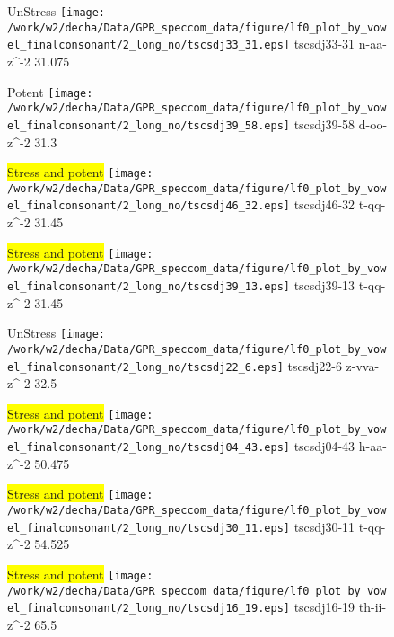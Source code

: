 \documentclass{article}
\begin{document}
\begin{figure}[t]
\begin{minipage}[b]{.24\textwidth}
UnStress
\centering
\texttt{[image: /work/w2/decha/Data/GPR\_speccom\_data/figure/lf0\_plot\_by\_vowel\_finalconsonant/2\_long\_no/tscsdj33\_31.eps]}
tscsdj33-31 n-aa-z\textasciicircum-2 31.075
\end{minipage}
\begin{minipage}[b]{.24\textwidth}
\colorbox{Apricot}{Potent}
\centering
\texttt{[image: /work/w2/decha/Data/GPR\_speccom\_data/figure/lf0\_plot\_by\_vowel\_finalconsonant/2\_long\_no/tscsdj39\_58.eps]}
tscsdj39-58 d-oo-z\textasciicircum-2 31.3
\end{minipage}
\begin{minipage}[b]{.24\textwidth}
\colorbox{yellow}{Stress and potent}
\centering
\texttt{[image: /work/w2/decha/Data/GPR\_speccom\_data/figure/lf0\_plot\_by\_vowel\_finalconsonant/2\_long\_no/tscsdj46\_32.eps]}
tscsdj46-32 t-qq-z\textasciicircum-2 31.45
\end{minipage}
\begin{minipage}[b]{.24\textwidth}
\colorbox{yellow}{Stress and potent}
\centering
\texttt{[image: /work/w2/decha/Data/GPR\_speccom\_data/figure/lf0\_plot\_by\_vowel\_finalconsonant/2\_long\_no/tscsdj39\_13.eps]}
tscsdj39-13 t-qq-z\textasciicircum-2 31.45
\end{minipage}
\end{figure}
\clearpage
\begin{figure}[t]
\begin{minipage}[b]{.24\textwidth}
UnStress
\centering
\texttt{[image: /work/w2/decha/Data/GPR\_speccom\_data/figure/lf0\_plot\_by\_vowel\_finalconsonant/2\_long\_no/tscsdj22\_6.eps]}
tscsdj22-6 z-vva-z\textasciicircum-2 32.5
\end{minipage}
\begin{minipage}[b]{.24\textwidth}
\colorbox{yellow}{Stress and potent}
\centering
\texttt{[image: /work/w2/decha/Data/GPR\_speccom\_data/figure/lf0\_plot\_by\_vowel\_finalconsonant/2\_long\_no/tscsdj04\_43.eps]}
tscsdj04-43 h-aa-z\textasciicircum-2 50.475
\end{minipage}
\begin{minipage}[b]{.24\textwidth}
\colorbox{yellow}{Stress and potent}
\centering
\texttt{[image: /work/w2/decha/Data/GPR\_speccom\_data/figure/lf0\_plot\_by\_vowel\_finalconsonant/2\_long\_no/tscsdj30\_11.eps]}
tscsdj30-11 t-qq-z\textasciicircum-2 54.525
\end{minipage}
\begin{minipage}[b]{.24\textwidth}
\colorbox{yellow}{Stress and potent}
\centering
\texttt{[image: /work/w2/decha/Data/GPR\_speccom\_data/figure/lf0\_plot\_by\_vowel\_finalconsonant/2\_long\_no/tscsdj16\_19.eps]}
tscsdj16-19 th-ii-z\textasciicircum-2 65.5
\end{minipage}
\end{figure}
\end{document}
